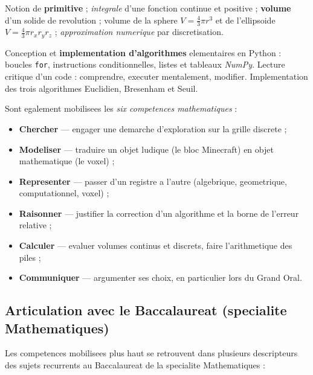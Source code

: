 \documentclass[12pt,a4paper]{scrartcl}
\newcommand{\acc}[1]{\textcolor{accent}{\textbf{#1}}}
\begin{document}
\begin{competence}
Notion de \acc{primitive} ; \emph{integrale} d'une fonction continue et positive ; \acc{volume} d'un solide de revolution ; volume de la sphere $V = \tfrac{4}{3}\pi r^3$ et de l'ellipsoide $V = \tfrac{4}{3}\pi r_x r_y r_z$ ; \emph{approximation numerique} par discretisation.
\end{competence}

\begin{competence}
Conception et \acc{implementation d'algorithmes} elementaires en Python : boucles \texttt{for}, instructions conditionnelles, listes et tableaux \emph{NumPy}. Lecture critique d'un code : comprendre, executer mentalement, modifier. Implementation des trois algorithmes Euclidien, Bresenham et Seuil.
\end{competence}

\medskip
Sont egalement mobilisees les \emph{six competences mathematiques} :

\begin{itemize}[leftmargin=1.3em,itemsep=0.15em,topsep=0.3em]
  \item \acc{Chercher} --- engager une demarche d'exploration sur la grille discrete ;
  \item \acc{Modeliser} --- traduire un objet ludique (le bloc Minecraft) en objet mathematique (le voxel) ;
  \item \acc{Representer} --- passer d'un registre a l'autre (algebrique, geometrique, computationnel, voxel) ;
  \item \acc{Raisonner} --- justifier la correction d'un algorithme et la borne de l'erreur relative ;
  \item \acc{Calculer} --- evaluer volumes continus et discrets, faire l'arithmetique des piles ;
  \item \acc{Communiquer} --- argumenter ses choix, en particulier lors du Grand Oral.
\end{itemize}

\subsection{Articulation avec le Baccalaureat (specialite Mathematiques)}\label{sec:bac}

Les competences mobilisees plus haut se retrouvent dans plusieurs descripteurs des sujets recurrents au Baccalaureat de la specialite Mathematiques :
\end{document}
